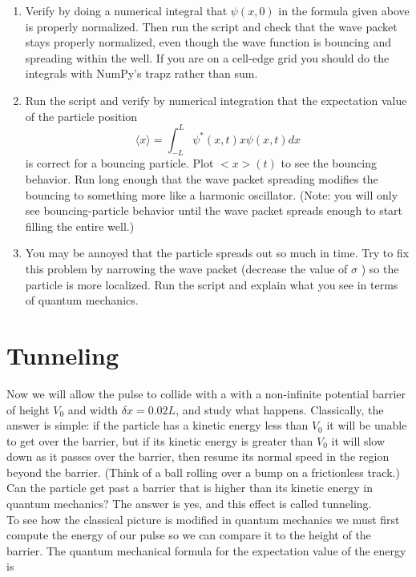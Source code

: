 \begin{problem}
\begin{enumerate}[label=(\alph*)]
\item Verify by doing a numerical integral that $\psi(x,0)$ in the formula given
above is properly normalized. Then run the script and check that
the wave packet stays properly normalized, even though the wave
function is bouncing and spreading within the well. If you are on a
cell-edge grid you should do the integrals with NumPy\rq s trapz rather
than sum.
\item Run the script and verify by numerical integration that the expectation
value of the particle position
\begin{equation}\label{eq:85}
\langle x\rangle=\int_{-L}^{L} \psi^{*}(x, t) x \psi(x, t) d x
\end{equation}
is correct for a bouncing particle. Plot $<x>(t)$ to see the bouncing
behavior. Run long enough that the wave packet spreading modifies
the bouncing to something more like a harmonic oscillator. (Note:
you will only see bouncing-particle behavior until the wave packet
spreads enough to start filling the entire well.)
\item You may be annoyed that the particle spreads out so much in time.
Try to fix this problem by narrowing the wave packet (decrease the
value of $\sigma$ ) so the particle is more localized. Run the script and explain
what you see in terms of quantum mechanics.


\end{enumerate}\end{problem}
\section*{Tunneling}
Now we will allow the pulse to collide with a with a non-infinite potential barrier
of height $V_0$ and width $\delta x = 0.02L$, and study what happens. Classically, the
answer is simple: if the particle has a kinetic energy less than $V_0$ it will be unable
to get over the barrier, but if its kinetic energy is greater than $V_0$ it will slow down
as it passes over the barrier, then resume its normal speed in the region beyond
the barrier. (Think of a ball rolling over a bump on a frictionless track.) Can
the particle get past a barrier that is higher than its kinetic energy in quantum
mechanics? The answer is yes, and this effect is called tunneling. \\ 
To see how the classical picture is modified in quantum mechanics we must
first compute the energy of our pulse so we can compare it to the height of the
barrier. The quantum mechanical formula for the expectation value of the energy
is

